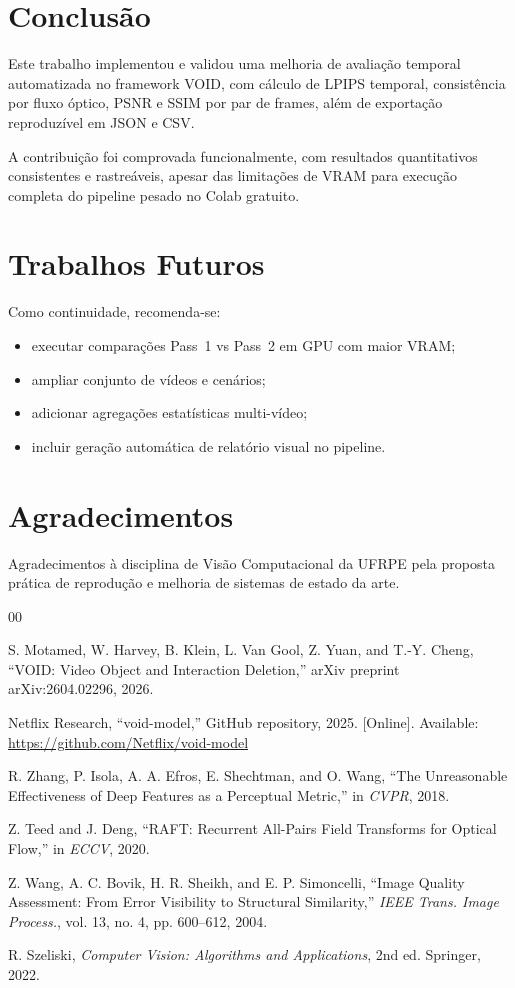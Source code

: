 \documentclass[conference]{IEEEtran}
\begin{document}
\section{Conclusão}
Este trabalho implementou e validou uma melhoria de avaliação temporal automatizada no framework VOID, com cálculo de LPIPS temporal, consistência por fluxo óptico, PSNR e SSIM por par de frames, além de exportação reproduzível em JSON e CSV.

A contribuição foi comprovada funcionalmente, com resultados quantitativos consistentes e rastreáveis, apesar das limitações de VRAM para execução completa do pipeline pesado no Colab gratuito.

\section{Trabalhos Futuros}
Como continuidade, recomenda-se:
\begin{itemize}
    \item executar comparações Pass~1 vs Pass~2 em GPU com maior VRAM;
    \item ampliar conjunto de vídeos e cenários;
    \item adicionar agregações estatísticas multi-vídeo;
    \item incluir geração automática de relatório visual no pipeline.
\end{itemize}

\section*{Agradecimentos}
Agradecimentos à disciplina de Visão Computacional da UFRPE pela proposta prática de reprodução e melhoria de sistemas de estado da arte.

\begin{thebibliography}{00}

S. Motamed, W. Harvey, B. Klein, L. Van Gool, Z. Yuan, and T.-Y. Cheng,
``VOID: Video Object and Interaction Deletion,''
arXiv preprint arXiv:2604.02296, 2026.

Netflix Research,
``void-model,''
GitHub repository, 2025.
[Online]. Available: \url{https://github.com/Netflix/void-model}

R. Zhang, P. Isola, A. A. Efros, E. Shechtman, and O. Wang,
``The Unreasonable Effectiveness of Deep Features as a Perceptual Metric,''
in \textit{CVPR}, 2018.

Z. Teed and J. Deng,
``RAFT: Recurrent All-Pairs Field Transforms for Optical Flow,''
in \textit{ECCV}, 2020.

Z. Wang, A. C. Bovik, H. R. Sheikh, and E. P. Simoncelli,
``Image Quality Assessment: From Error Visibility to Structural Similarity,''
\textit{IEEE Trans. Image Process.}, vol. 13, no. 4, pp. 600--612, 2004.

R. Szeliski,
\textit{Computer Vision: Algorithms and Applications}, 2nd ed.
Springer, 2022.

\end{thebibliography}
\end{document}
